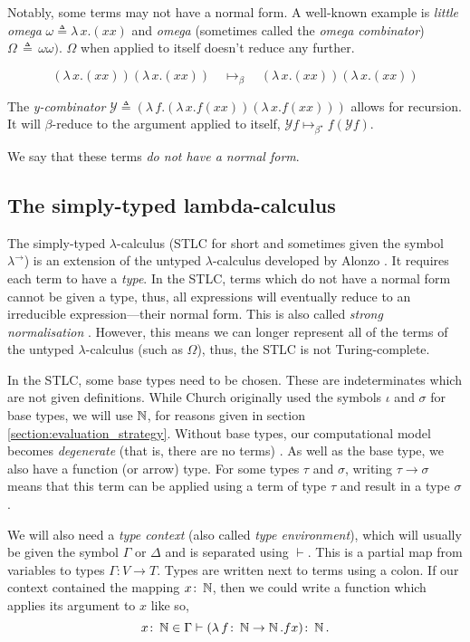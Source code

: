 Notably, some terms may not have a normal form. A well-known example is \textit{little omega} $\omega
\triangleq \lambda \, x. (x x)$ and \textit{omega} (sometimes called the \textit{omega combinator})
$\Omega \, \triangleq \, \omega \omega)$. $\Omega$ when applied to itself doesn't reduce any further.

\begin{equation*}
  (\lambda \, x. (x x)) (\lambda \, x. (x x)) \quad
  \mapsto_{\beta} \quad (\lambda \, x. (x x)) (\lambda \, x. (x x))
\end{equation*}

The \textit{y-combinator} $\mathcal{Y} \triangleq (\lambda \, f. (\lambda \, x. f (x x )) (\lambda
\, x. f (xx)))$ allows for recursion. It will $\beta$-reduce to the argument applied to itself,
$\mathcal{Y} f \mapsto_{\beta^{\star}} f (\mathcal{Y} f)$.

We say that these terms \textit{do not have a normal form}.

\subsection{The simply-typed lambda-calculus}
The simply-typed $\lambda$-calculus (STLC for short and sometimes given the symbol
$\lambda^{\rightarrow}$) is an extension of the untyped $\lambda$-calculus developed by Alonzo
\citet{church_formulation_1940}. It requires each term to have a \textit{type}. In the STLC, terms
which do not have a normal form cannot be given a type, thus, all expressions will eventually reduce
to an irreducible expression---their normal form. This is also called \textit{strong normalisation}
\citep{pierce_types_2002}. However, this means we can longer represent all of the terms of the
untyped $\lambda$-calculus (such as $\Omega$), thus, the STLC is not Turing-complete.

In the STLC, some base types need to be chosen. These are indeterminates which are not given
definitions. While Church originally used the symbols $\iota$ and $\sigma$ for base types, we will
use $\operatorname{\mathbb{N}}$, for reasons given in section \ref{section:evaluation_strategy}. Without base types, our
computational model becomes \textit{degenerate} (that is, there are no terms)
\citep{pierce_types_2002}. As well as the base type, we also have a function (or arrow) type. For
some types $\tau$ and $\sigma$, writing $\tau \to \sigma$ means that this term can be applied using
a term of type $\tau$ and result in a type $\sigma$.

We will also need a \textit{type context} (also called \textit{type environment}), which will
usually be given the symbol $\Gamma$ or $\Delta$ and is separated using $\vdash$. This is a partial
map from variables to types $\Gamma \colon V \to T$. Types are written next to terms using a colon.
If our context contained the mapping $x \colon \operatorname{\mathbb{N}}$, then we could write a function which applies
its argument to $x$ like so,
\begin{equation*}
  x \colon \operatorname{\mathbb{N}} \in \Gamma \vdash (\lambda \, f \colon \operatorname{\mathbb{N}} \to \operatorname{\mathbb{N}} . f x) \colon \operatorname{\mathbb{N}}.
\end{equation*}

